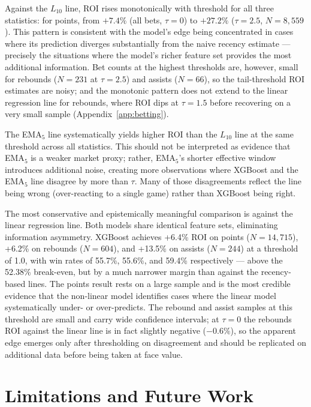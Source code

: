 \documentclass[12pt, letterpaper]{article}
\begin{document}
Against the $L_{10}$ line, ROI rises monotonically with threshold for all
three statistics: for points, from $+7.4\%$ (all bets, $\tau=0$) to
$+27.2\%$ ($\tau=2.5$, $N=8{,}559$).
This pattern is consistent with the model's edge being concentrated in
cases where its prediction diverges substantially from the naive recency
estimate --- precisely the situations where the model's richer feature set
provides the most additional information.
Bet counts at the highest thresholds are, however, small for rebounds
($N=231$ at $\tau=2.5$) and assists ($N=66$), so the tail-threshold ROI
estimates are noisy; and the monotonic pattern does not extend to the
linear regression line for rebounds, where ROI dips at $\tau=1.5$ before
recovering on a very small sample (Appendix~\ref{app:betting}).

The EMA$_5$ line systematically yields higher ROI than the $L_{10}$ line
at the same threshold across all statistics.
This should not be interpreted as evidence that EMA$_5$ is a weaker market
proxy; rather, EMA$_5$'s shorter effective window introduces additional
noise, creating more observations where XGBoost and the EMA$_5$ line disagree
by more than $\tau$.
Many of those disagreements reflect the line being wrong (over-reacting to
a single game) rather than XGBoost being right.

The most conservative and epistemically meaningful comparison is against the
linear regression line.
Both models share identical feature sets, eliminating information asymmetry.
XGBoost achieves +6.4\% ROI on points ($N=14{,}715$), +6.2\% on rebounds
($N=604$), and +13.5\% on assists ($N=244$) at a threshold of 1.0, with
win rates of 55.7\%, 55.6\%, and 59.4\% respectively --- above the 52.38\%
break-even, but by a much narrower margin than against the recency-based
lines.
The points result rests on a large sample and is the most credible evidence
that the non-linear model identifies cases where the linear model
systematically under- or over-predicts.
The rebound and assist samples at this threshold are small and carry wide
confidence intervals; at $\tau=0$ the rebounds ROI against the linear line
is in fact slightly negative ($-0.6\%$), so the apparent edge emerges only
after thresholding on disagreement and should be replicated on additional
data before being taken at face value.

\section{Limitations and Future Work}
\label{sec:limits}
\end{document}
